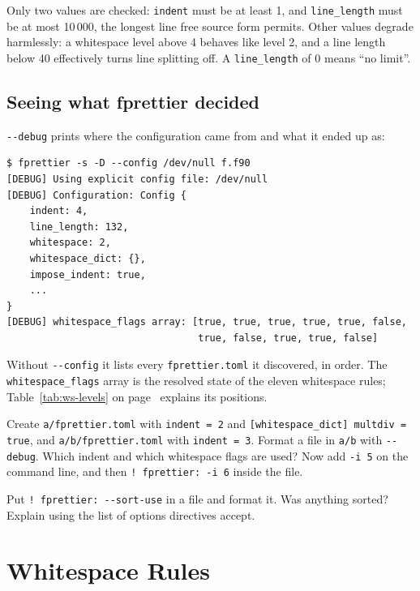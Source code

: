 \documentclass[11pt,a4paper,openany]{book}
\newcommand{\code}[1]{\texttt{\small #1}}
\newcommand{\file}[1]{\texttt{\small\color{accent}#1}}
\newcommand{\flag}[1]{\texttt{\small -{}-#1}}
\newcounter{exercise}[chapter]
\begin{document}
Only two values are checked: \code{indent} must be at least 1, and
\code{line\_length} must be at most 10\,000, the longest line free source form
permits. Other values degrade harmlessly: a whitespace level above 4 behaves
like level 2, and a line length below 40 effectively turns line splitting off.
A \code{line\_length} of 0 means ``no limit''.

\section{Seeing what fprettier decided}\label{sec:debug}

\flag{debug} prints where the configuration came from and what it ended up as:

\begin{lstlisting}[style=plain]
$ fprettier -s -D --config /dev/null f.f90
[DEBUG] Using explicit config file: /dev/null
[DEBUG] Configuration: Config {
    indent: 4,
    line_length: 132,
    whitespace: 2,
    whitespace_dict: {},
    impose_indent: true,
    ...
}
[DEBUG] whitespace_flags array: [true, true, true, true, true, false,
                                 true, false, true, true, false]
\end{lstlisting}

Without \flag{config} it lists every \file{fprettier.toml} it discovered, in
order. The \code{whitespace\_flags} array is the resolved state of the eleven
whitespace rules; Table~\ref{tab:ws-levels} on page~\pageref{tab:ws-levels}
explains its positions.

\begin{exercise}[Layering]
Create \file{a/fprettier.toml} with \code{indent = 2} and
\code{[whitespace\_dict] multdiv = true}, and \file{a/b/fprettier.toml} with
\code{indent = 3}. Format a file in \file{a/b} with \flag{debug}. Which
indent and which whitespace flags are used? Now add \code{-i 5} on the command
line, and then \code{! fprettier: -i 6} inside the file.
\end{exercise}

\begin{exercise}
Put \code{! fprettier: -{}-sort-use} in a file and format it. Was anything
sorted? Explain using the list of options directives accept.
\end{exercise}
\chapter{Whitespace Rules}\label{ch:whitespace-user}
\end{document}
